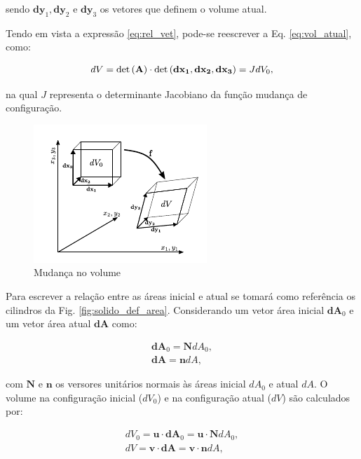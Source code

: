 \documentclass[tese_patricia]{subfiles}
\begin{document}
\noindent  sendo $\mathbf{dy}_1,\mathbf{dy}_2$ e $\mathbf{dy}_3$ os vetores que definem o volume atual.

Tendo em vista a expressão \ref{eq:rel_vet}, pode-se reescrever a Eq. \ref{eq:vol_atual}, como:

\begin{align}
dV = \det{\left(\mathbf{A}\right)} \cdot \det{(\mathbf{dx_1},\mathbf{dx_2},\mathbf{dx_3})}  = JdV_{0} \label {eq:vol_atual2},
\end{align}

\noindent na qual $J$ representa o determinante Jacobiano da função mudança de configuração.

\begin{figure}[htb!]
	\centering
	\includegraphics[scale=2.0]{Imagens/Cap4/sol_def_vol.pdf}	
	\caption{Mudança no volume}
	\label{fig:solido_def_vol}
\end{figure}

Para escrever a relação entre as áreas inicial e atual se tomará como referência os cilindros da Fig. \ref{fig:solido_def_area}. Considerando um vetor área inicial $\mathbf{dA}_{0}$ e um vetor área atual $\mathbf{dA}$ como:

\begin{align}
\mathbf{dA}_{0} = \mathbf{N}dA_{0},\\
\mathbf{dA} = \mathbf{n}dA \label{eq:areas},
\end{align}

\noindent com $\mathbf{N}$ e $\mathbf{n}$ os versores unitários normais às áreas inicial $dA_{0}$ e atual $dA$. O volume na configuração inicial ($dV_{0}$) e na configuração atual ($dV$) são calculados por:

\begin{align}
dV_{0} = \mathbf{u} \cdot \mathbf{dA}_{0} = \mathbf{u} \cdot \mathbf{N} dA_0 ,\\
dV = \mathbf{v} \cdot \mathbf{dA} = \mathbf{v} \cdot \mathbf{n} dA \label{eq:vol_func_area},
\end{align}
\end{document}
